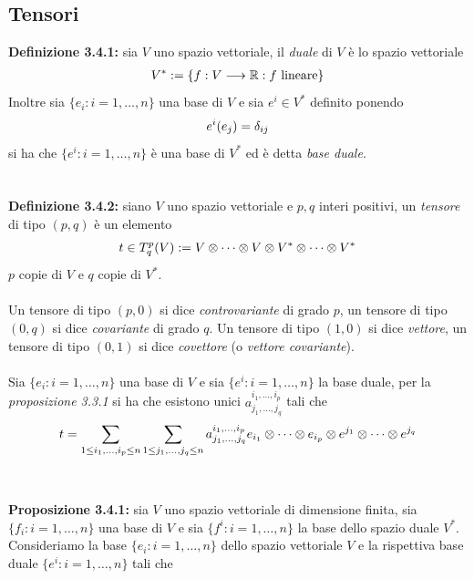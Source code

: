 \documentclass{article}
\begin{document}
\newpage
\subsection{Tensori}
\textbf{Definizione 3.4.1:} sia $V$ uno spazio vettoriale, il \textit{duale} di $V$ è lo spazio vettoriale
\begin{gather}
    V^* := \{ f : V \longrightarrow \mathbb{R} : f \text{ lineare} \} \notag
\end{gather}
Inoltre sia $\{ e_i : i = 1, \dots, n \}$ una base di $V$ e sia $e^i \in V^*$ definito ponendo
\begin{gather}
    e^i(e_j) = \delta_{ij} \notag
\end{gather}
si ha che $\{ e^i : i = 1, \dots, n \}$ è una base di $V^*$ ed è detta \textit{base duale}. \\ \\ \\
\textbf{Definizione 3.4.2:} siano $V$ uno spazio vettoriale e $p, q$ interi positivi, un \textit{tensore} di tipo $(p, q)$ è un elemento
\begin{gather}
    t \in T^p_q(V) := V \otimes \dots \otimes V \otimes V^* \otimes \dots \otimes V^* \notag
\end{gather}
$p$ copie di $V$ e $q$ copie di $V^*$. \\ \\
Un tensore di tipo $(p, 0)$ si dice \textit{controvariante} di grado $p$, un tensore di tipo $(0, q)$ si dice \textit{covariante} di grado $q$. Un tensore di tipo $(1, 0)$ si dice \textit{vettore}, un tensore di tipo $(0, 1)$ si dice \textit{covettore} (o \textit{vettore covariante}). \\ \\ 
Sia $\{ e_i : i = 1, \dots, n \}$ una base di $V$ e sia $\{ e^i : i = 1, \dots, n \}$ la base duale, per la \textit{proposizione 3.3.1} si ha che esistono unici $a^{i_1, \dots, i_p}_{j_1, \dots, j_q}$ tali che
\begin{gather}
    t = \sum_{1 \leq i_1, \dots, i_p \leq n} \sum_{1 \leq j_1, \dots, j_q \leq n} a^{i_1, \dots, i_p}_{j_1, \dots, j_q} e_{i_1} \otimes \dots \otimes e_{i_p} \otimes e^{j_1} \otimes \dots \otimes e^{j_q} \notag
\end{gather} \\ \\
\textbf{Proposizione 3.4.1:} sia $V$ uno spazio vettoriale di dimensione finita, sia $\{ f_i : i = 1, \dots, n \}$ una base di $V$ e sia $\{ f^i : i = 1, \dots, n \}$ la base dello spazio duale $V^*$. Consideriamo la base $\{ e_i : i = 1, \dots, n \}$ dello spazio vettoriale $V$ e la rispettiva base duale $\{ e^i : i = 1, \dots, n \}$ tali che
\end{document}
